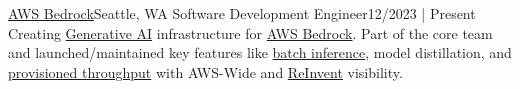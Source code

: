 \resumeSubheading
{\href{https://aws.amazon.com/bedrock/}{AWS Bedrock}}{Seattle, WA}
{Software Development Engineer}{12/2023 | Present}
\resumeItemListStart
{}
{Creating \href{https://en.wikipedia.org/wiki/Generative_artificial_intelligence}{Generative AI} infrastructure for \href{https://aws.amazon.com/bedrock/}{AWS Bedrock}. Part of the core team and launched/maintained key features like \href{https://docs.aws.amazon.com/bedrock/latest/userguide/batch-inference.html}{batch inference}, model distillation, and \href{https://docs.aws.amazon.com/bedrock/latest/userguide/prov-throughput.html}{provisioned throughput} with AWS-Wide and \href{https://reinvent.awsevents.com/}{ReInvent} visibility.}
\resumeItemListEnd
